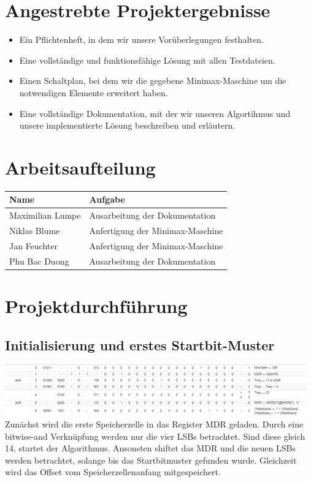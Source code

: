 \documentclass[12pt,titlepage,german,a4]{article}
\begin{document}
    \section{Angestrebte Projektergebnisse}
        \begin{itemize}
            \item Ein Pflichtenheft, in dem wir unsere Vor{\"u}berlegungen festhalten.
            \item Eine vollst{\"a}ndige und funktionsf{\"a}hige L{\"o}sung mit allen Testdateien.
            \item Einen Schaltplan, bei dem wir die gegebene Minimax-Maschine um die notwendigen Elemente erweitert haben.
            \item Eine vollst{\"a}ndige Dokumentation, mit der wir unseren Algortihmus und unsere implementierte L{\"o}sung beschreiben und erl{\"a}utern.
        \end{itemize}

    \section{Arbeitsaufteilung}
    \begin{table}[htpb]
        \begin{tabular}{|l|l|}
            \hline
            \textbf{Name} & \textbf{Aufgabe} \\
            \hline
            Maximilian Lumpe & Ausarbeitung der Dokumentation  \\
            \hline
            Niklas Blume & Anfertigung der Minimax-Maschine \\
            \hline
            Jan Feuchter & Anfertigung der Minimax-Maschine \\
            \hline
            Phu Bac Duong & Ausarbeitung der Dokumentation \\
            \hline
        \end{tabular}
    \end{table}

    \newpage

    \section{Projektdurchf{\"u}hrung}
    \subsection{Initialisierung und erstes Startbit-Muster}
	\includegraphics[width=13cm]{img/k1.png} \\
    Zun{\"a}chst wird die erste Speicherzelle in das Register MDR geladen. Durch eine bitwise-and Verkn{\"u}pfung werden nur die vier LSBs betrachtet. Sind diese gleich 14, startet der Algorithmus. Ansonsten shiftet das MDR und die neuen LSBs werden betrachtet, solange bis das Startbitmuster gefunden wurde. Gleichzeit wird das Offset vom Speicherzellenanfang mitgespeichert.
\end{document}
